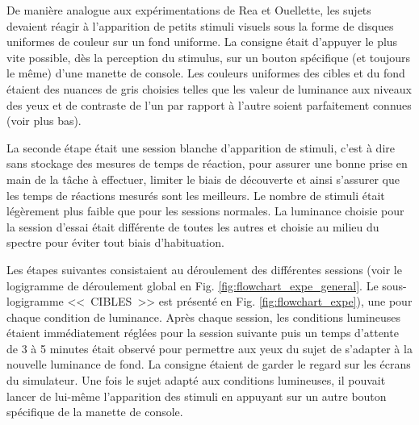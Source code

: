 	\par De manière analogue aux expérimentations de Rea et Ouellette, les sujets devaient réagir à l'apparition de petits stimuli visuels sous la forme de disques uniformes de couleur sur un fond uniforme. La consigne était d'appuyer le plus vite possible, dès la perception du stimulus, sur un bouton spécifique (et toujours le même) d'une manette de console. Les couleurs uniformes des cibles et du fond étaient des nuances de gris choisies telles que les valeur de luminance aux niveaux des yeux et de contraste de l'un par rapport à l'autre soient parfaitement connues (voir plus bas).
	
	\par La seconde étape était une session blanche d'apparition de stimuli, c'est à dire sans stockage des mesures de temps de réaction, pour assurer une bonne prise en main de la tâche à effectuer, limiter le biais de découverte et ainsi s'assurer que les temps de réactions mesurés sont les meilleurs. Le nombre de stimuli était légèrement plus faible que pour les sessions normales. La luminance choisie pour la session d'essai était différente de toutes les autres et choisie au milieu du spectre pour éviter tout biais d'habituation.
	
	\par Les étapes suivantes consistaient au déroulement des différentes sessions (voir le logigramme de déroulement global en Fig. \ref{fig:flowchart_expe_general}. Le sous-logigramme <<~CIBLES~>> est présenté en Fig. \ref{fig:flowchart_expe}), une pour chaque condition de luminance. Après chaque session, les conditions lumineuses étaient immédiatement réglées pour la session suivante puis un temps d'attente de 3 à 5 minutes était observé pour permettre aux yeux du sujet de s'adapter à la nouvelle luminance de fond. La consigne étaient de garder le regard sur les écrans du simulateur. Une fois le sujet adapté aux conditions lumineuses, il pouvait lancer de lui-même l'apparition des stimuli en appuyant sur un autre bouton spécifique de la manette de console.
	
